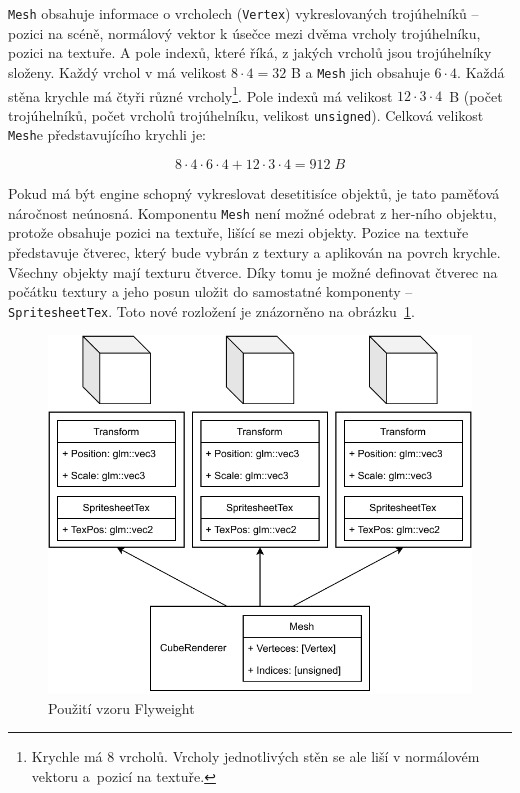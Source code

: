 \documentclass[thesis=M,czech]{FITthesis}[2019/12/23]
\begin{document}
\texttt{Mesh} obsahuje informace o vrcholech (\texttt{Vertex}) vykreslovaných trojúhelníků -- pozici na scéně, normálový vektor k úsečce mezi dvěma vrcholy trojúhelníku, pozici na textuře. A pole indexů, které říká, z jakých vrcholů jsou trojúhelníky složeny. Každý vrchol v má velikost $8 \cdot 4 = 32$ B a \texttt{Mesh} jich obsahuje $6 \cdot 4$. Každá stěna krychle má čtyři různé vrcholy\footnote{Krychle má 8 vrcholů. Vrcholy jednotlivých stěn se ale liší v normálovém vektoru a~pozicí na textuře.}. Pole indexů má velikost $12 \cdot 3 \cdot 4$~B (počet trojúhelníků, počet vrcholů trojúhelníku, velikost \texttt{unsigned}). Celková velikost \texttt{Mesh}e představujícího krychli je:

\[8 \cdot 4 \cdot 6 \cdot 4 + 12 \cdot 3 \cdot 4 = 912\; B\]

Pokud má být engine schopný vykreslovat desetitisíce objektů, je tato paměťová náročnost neúnosná. Komponentu \texttt{Mesh} není možné odebrat z her-ního objektu, protože obsahuje pozici na textuře, lišící se mezi objekty. Pozice na textuře představuje čtverec, který bude vybrán z textury a aplikován na povrch krychle. Všechny objekty mají texturu čtverce. Díky tomu je možné definovat čtverec na počátku textury a jeho posun uložit do samostatné komponenty -- \texttt{SpritesheetTex}. Toto nové rozložení je znázorněno na obrázku~\ref{fig:go_components_fw}.

\begin{figure}\centering
	\includegraphics[width=\textwidth]{images/go_components_fw}
	\caption[Použití vzoru Flyweight]{Použití vzoru Flyweight}\label{fig:go_components_fw}
\end{figure}
\end{document}
